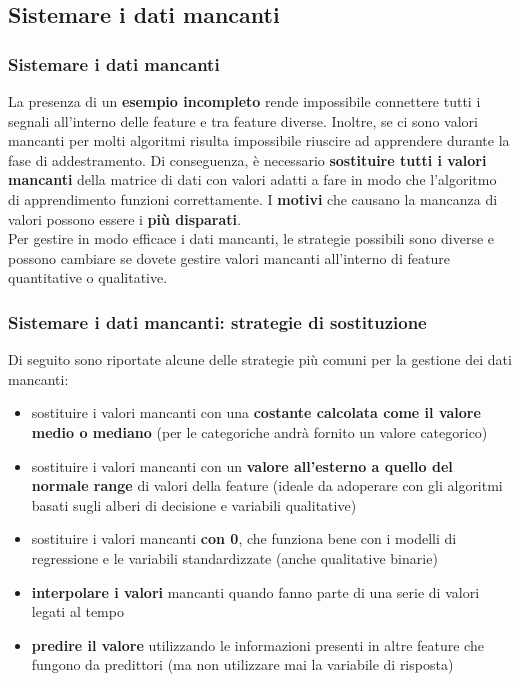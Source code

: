 \subsection[Sistemare i dati mancanti]{Sistemare i dati mancanti}

\begin{frame}
	\frametitle{{\color{GradientDescentDiagramGreen}Sistemare i dati mancanti}}

		La presenza di un \textbf{esempio incompleto} rende impossibile connettere tutti i segnali all'interno delle feature e tra feature diverse. Inoltre, se ci sono valori mancanti per molti algoritmi risulta impossibile riuscire ad apprendere durante la fase di addestramento.
		\newlinedouble
		Di conseguenza, è necessario \textbf{sostituire tutti i valori mancanti} della matrice di dati con valori adatti a fare in modo che l’algoritmo di apprendimento funzioni correttamente.
		\newlinedouble
		I \textbf{motivi} che causano la mancanza di valori possono essere i \textbf{più disparati}.\\
		Per gestire in modo efficace i dati mancanti, le strategie possibili sono diverse e possono cambiare se dovete gestire valori mancanti all’interno di feature quantitative o qualitative.
	
\end{frame}


\begin{frame}
	\frametitle{{\color{GradientDescentDiagramGreen}Sistemare i dati mancanti}: strategie di sostituzione}

		Di seguito sono riportate alcune delle strategie più comuni per la gestione dei dati mancanti:
		\begin{itemize}
			\item sostituire i valori mancanti con una \textbf{costante calcolata come il valore medio o mediano} (per le categoriche andrà fornito un valore categorico)
			\item sostituire i valori mancanti con un \textbf{valore all’esterno a quello del normale range} di valori della feature (ideale da adoperare con gli algoritmi basati sugli alberi di decisione e variabili qualitative)
			\item sostituire i valori mancanti \textbf{con 0}, che funziona bene con i modelli di regressione e le variabili standardizzate (anche qualitative binarie)
			\item \textbf{interpolare i valori} mancanti quando fanno parte di una serie di valori legati al tempo
			\item \textbf{predire il valore} utilizzando le informazioni presenti in altre feature che fungono da predittori (ma non utilizzare mai la variabile di risposta)
		\end{itemize}
	
\end{frame}